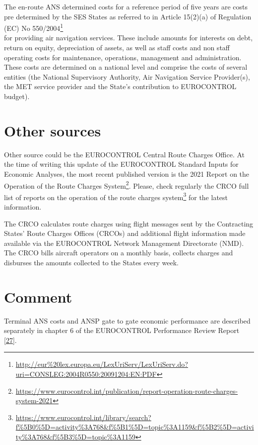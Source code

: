 \documentclass[
  11pt,
  a4paper,
]{book}
\DeclareRobustCommand{\href}[2]{#2\footnote{\url{#1}}}
\begin{document}
The en-route ANS determined costs for a reference period of five years
are costs pre determined by the SES States as referred to in Article
15(2)(a) of
\href{http://eur\%20lex.europa.eu/LexUriServ/LexUriServ.do?uri=CONSLEG:2004R0550:20091204:EN:PDF}{Regulation
(EC) No 550/2004}\\
for providing air navigation services. These include amounts for
interests on debt, return on equity, depreciation of assets, as well as
staff costs and non staff operating costs for maintenance, operations,
management and administration. These costs are determined on a national
level and comprise the costs of several entities (the National
Supervisory Authority, Air Navigation Service Provider(s), the MET
service provider and the State's contribution to EUROCONTROL budget).

\hypertarget{other-sources}{%
\section{Other sources}\label{other-sources}}

Other source could be the EUROCONTROL Central Route Charges Office. At
the time of writing this update of the EUROCONTROL Standard Inputs for
Economic Analyses, the most recent published version is the
\href{https://www.eurocontrol.int/publication/report-operation-route-charges-system-2021}{2021
Report on the Operation of the Route Charges System}. Please, check
regularly the
\href{https://www.eurocontrol.int/library/search?f\%5B0\%5D=activity\%3A768\&f\%5B1\%5D=topic\%3A1159\&f\%5B2\%5D=activity\%3A768\&f\%5B3\%5D=topic\%3A1159}{CRCO
full list of reports on the operation of the route charges system} for
the latest information.

The CRCO calculates route charges using flight messages sent by the
Contracting States' Route Charges Offices (CRCOs) and additional flight
information made available via the EUROCONTROL Network Management
Directorate (NMD). The CRCO bills aircraft operators on a monthly basis,
collects charges and disburses the amounts collected to the States every
week.

\hypertarget{comment-2}{%
\section{Comment}\label{comment-2}}

Terminal ANS costs and ANSP gate to gate economic performance are
described separately in chapter 6 of the EUROCONTROL Performance Review
Report \protect\hyperlink{ref-ectrlprr2022}{{[}27{]}}.
\end{document}
